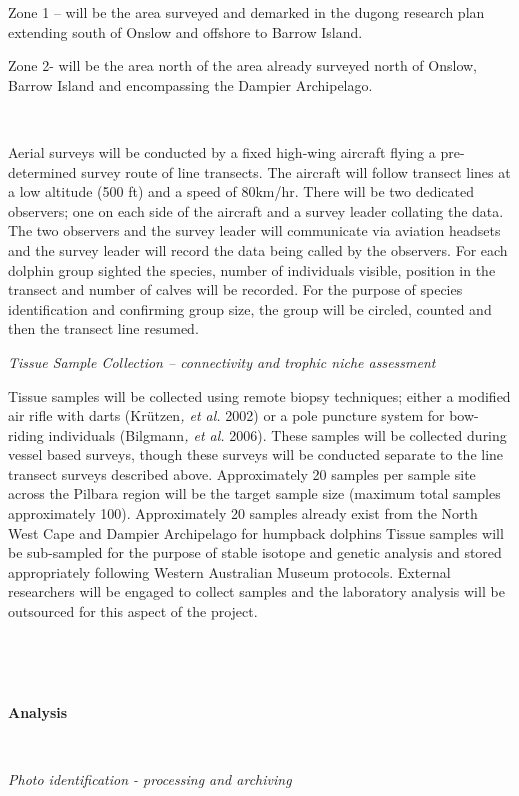 \documentclass[version=last,
    paper=a4,                               %
    10pt,                                   %
    dvipsnames,
    oneside,                              %
    headings=openany,                       %
    open=any,
    BCOR=7mm,                               %
    DIV=15,     %
]{scrbook}
\begin{document}
Zone 1 -- will be the area surveyed and demarked in the dugong research
plan extending south of Onslow and offshore to Barrow Island.

Zone 2- will be the area north of the area already surveyed north of
Onslow, Barrow Island and encompassing the Dampier Archipelago.

~

Aerial surveys will be conducted by a fixed high-wing aircraft flying a
pre-determined survey route of line transects. The aircraft will follow
transect lines at a low altitude (500 ft) and a speed of 80km/hr. There
will be two dedicated observers; one on each side of the aircraft and a
survey leader collating the data. The two observers and the survey
leader will communicate via aviation headsets and the survey leader will
record the data being called by the observers. For each dolphin group
sighted the species, number of individuals visible, position in the
transect and number of calves will be recorded. For the purpose of
species identification and confirming group size, the group will be
circled, counted and then the transect line resumed.

\emph{Tissue Sample Collection -- connectivity and trophic niche
assessment}

Tissue samples will be collected using remote biopsy techniques; either
a modified air rifle with darts (Krützen\emph{, et al.} 2002) or a pole
puncture system for bow-riding individuals (Bilgmann\emph{, et al.}
2006). These samples will be collected during vessel based surveys,
though these surveys will be conducted separate to the line transect
surveys described above. Approximately 20 samples per sample site across
the Pilbara region will be the target sample size (maximum total samples
approximately 100). Approximately 20 samples already exist from the
North West Cape and Dampier Archipelago for humpback dolphins Tissue
samples will be sub-sampled for the purpose of stable isotope and
genetic analysis and stored appropriately following Western Australian
Museum protocols. External researchers will be engaged to collect
samples and the laboratory analysis will be outsourced for this aspect
of the project.

~

~

\textbf{Analysis}

\emph{~}

\emph{Photo identification - processing and archiving}
\end{document}
